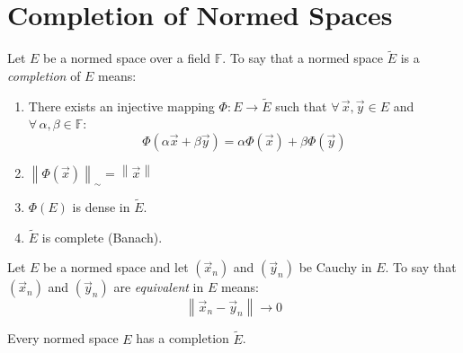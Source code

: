 \documentclass[letterpaper,12pt,fleqn]{article}
\newcommand{\F}{\mathbb{F}}
\newcommand{\Et}{\tilde{E}}
\renewcommand{\o}{\Phi}
\newcommand{\vx}{\vec{x}}
\newcommand{\vy}{\vec{y}}
\renewcommand{\a}{\alpha}
\renewcommand{\b}{\beta}
\newcommand{\norm}[1]{\left\|#1\right\|}
\begin{document}
\section*{Completion of Normed Spaces}

\begin{definition}[Completion]
  Let $E$ be a normed space over a field $\F$. To say that a normed space
  $\Et$ is a \emph{completion} of $E$ means:
  \begin{enumerate}
  \item There exists an injective mapping $\o:E\to\Et$ such that
    $\forall\,\vx,\vy\in E$ and $\forall\,\a,\b\in\F$:
    \[\o(\a\vx+\b\vy)=\a\o(\vx)+\b\o(\vy)\]
  \item $\norm{\o(\vx)}_{\sim}=\norm{\vx}$
  \item $\o(E)$ is dense in $\Et$.
  \item $\Et$ is complete (Banach).
  \end{enumerate}
\end{definition}

\begin{definition}[Equivalence]
  Let $E$ be a normed space and let $(\vx_n)$ and $(\vy_n)$ be Cauchy in $E$.
  To say that $(\vx_n)$ and $(\vy_n)$ are \emph{equivalent} in $E$ means:
  \[\norm{\vx_n-\vy_n}\to0\]
\end{definition}

\begin{theorem}
  Every normed space $E$ has a completion $\Et$.
\end{theorem}
\end{document}
